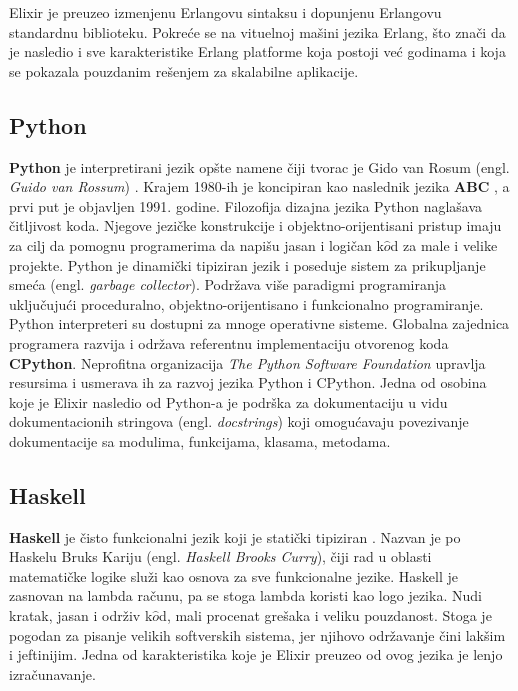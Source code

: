 \documentclass[12pt,oneside]{memoir}
\begin{document}
Elixir je preuzeo izmenjenu Erlangovu sintaksu i dopunjenu Erlangovu standardnu biblioteku. Pokreće se na vituelnoj mašini jezika Erlang, što znači da je nasledio i sve karakteristike Erlang platforme koja postoji već godinama i koja se pokazala pouzdanim rešenjem za skalabilne aplikacije.

\subsection{Python}
\textbf{Python} je interpretirani jezik opšte namene čiji tvorac je Gido van Rosum (engl. \textit{Guido van Rossum}) \cite{Python}. Krajem 1980-ih je koncipiran kao naslednik jezika \textbf{ABC} \cite{ABC}, a prvi put je objavljen 1991. godine. Filozofija dizajna jezika Python naglašava čitljivost koda. Njegove jezičke konstrukcije i objektno-orijentisani pristup imaju za cilj da pomognu programerima da napišu jasan i logičan k$\hat{o}$d za male i velike projekte. Python je dinamički tipiziran jezik i poseduje sistem za prikupljanje smeća (engl. \textit{garbage collector}). Podržava više paradigmi programiranja uključujući proceduralno, objektno-orijentisano i funkcionalno programiranje. Python interpreteri su dostupni za mnoge operativne sisteme. Globalna zajednica programera razvija i održava referentnu implementaciju otvorenog koda \textbf{CPython}. Neprofitna organizacija \textit{The Python Software Foundation} upravlja resursima i usmerava ih za razvoj jezika Python i CPython. Jedna od osobina koje je Elixir nasledio od Python-a je podrška za dokumentaciju u vidu dokumentacionih stringova (engl. \textit{docstrings}) koji omogućavaju povezivanje dokumentacije sa modulima, funkcijama, klasama, metodama.

\newpage

\subsection{Haskell}
\textbf{Haskell} je čisto funkcionalni jezik koji je statički tipiziran \cite{Haskell}. Nazvan je po Haskelu Bruks Kariju (engl. \textit{Haskell Brooks Curry}), čiji rad u oblasti matematičke logike služi kao osnova za sve funkcionalne jezike. Haskell je zasnovan na lambda računu, pa se stoga lambda koristi kao logo jezika. Nudi kratak, jasan i održiv k$\hat{o}$d, mali procenat grešaka i veliku pouzdanost. Stoga je pogodan za pisanje velikih softverskih sistema, jer njihovo održavanje čini lakšim i jeftinijim. Jedna od karakteristika koje je Elixir preuzeo od ovog jezika je lenjo izračunavanje.
\end{document}
